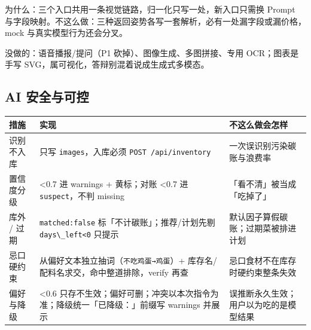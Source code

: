 为什么：三个入口共用一条视觉链路，归一化只写一处，新入口只需换 Prompt
与字段映射。不这么做：三种返回姿势各写一套解析，必有一处漏字段或漏价格，mock
与真实模型行为还会分叉。

没做的：语音播报/提问（P1 砍掉）、图像生成、多图拼接、专用
OCR；图表是手写 SVG，属可视化，答辩别混着说成生成式多模态。

\subsection{AI 安全与可控}\label{ai-ux5b89ux5168ux4e0eux53efux63a7}

{\def\LTcaptype{none} %
\begin{longtable}[]{@{}
  >{\raggedright\arraybackslash}p{}
  >{\raggedright\arraybackslash}p{}
  >{\raggedright\arraybackslash}p{}@{}}
\toprule\noalign{}
\begin{minipage}[b]{\linewidth}\raggedright
措施
\end{minipage} & \begin{minipage}[b]{\linewidth}\raggedright
实现
\end{minipage} & \begin{minipage}[b]{\linewidth}\raggedright
不这么做会怎样
\end{minipage} \\
\midrule\noalign{}
\endhead
\bottomrule\noalign{}
\endlastfoot
识别不入库 & 只写 \passthrough{\lstinline!images!}，入库必须
\passthrough{\lstinline!POST /api/inventory!} &
一次误识别污染碳账与浪费率 \\
置信度分级 & \textless0.7 进 warnings + 黄标；对账 \textless0.7 进
\passthrough{\lstinline!suspect!}，不判 missing &
「看不清」被当成「吃掉了」 \\
库外 / 过期 & \passthrough{\lstinline!matched:false!}
标「不计碳账」；推荐/计划先剔 \passthrough{\lstinline!days\_left<0!}
只提示 & 默认因子算假碳账；过期菜被排进计划 \\
忌口硬约束 &
从偏好文本独立抽词（\passthrough{\lstinline!不吃鸡蛋→鸡蛋!}）+
库存名/配料名求交，命中整道排除，verify 再查 &
忌口食材不在库存时硬约束整条失效 \\
偏好与降级 & \textless0.6
只存不生效；偏好可删；冲突以本次指令为准；降级统一「已降级：」前缀写
warnings 并展示 & 误推断永久生效；用户以为吃的是模型结果 \\
\end{longtable}
}

